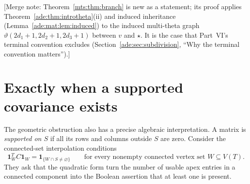 \documentclass[11pt]{article}
\numberwithin{equation}{section}
\theoremstyle{definition}
\newcommand{\one}{\mathbf 1}
\newcommand{\ind}{\mathbf 1}
\begin{document}
[Merge note: Theorem~\ref{mts:thm:branch} is new as a statement; its
proof applies Theorem~\ref{ade:thm:introtheta}(ii) and induced
inheritance (Lemma~\ref{ade:mat:lem:induced}) to the induced multi-theta
graph $\vartheta(2d_1+1,2d_2+1,2d_3+1)$ between $v$ and $\star$. It is the
case that Part~VI's terminal convention excludes
(Section~\ref{ade:sec:subdivision}, ``Why the terminal convention
matters'').]

\section{Exactly when a supported covariance exists}\label{mts:sec:covariance}

The geometric obstruction also has a precise algebraic interpretation.
A matrix is \emph{supported on $S$} if all its rows and columns outside
$S$ are zero. Consider the connected-set interpolation conditions
\begin{equation}
 \one_W^T C\one_W=\ind_{\{W\cap S\ne\varnothing\}}
 \qquad\text{for every nonempty connected vertex set }W\subseteq V(T).
 \label{mts:eq:energy}
\end{equation}
They ask that the quadratic form turn the number of usable apex entries
in a connected component into the Boolean assertion that at least one is
present.
\end{document}
